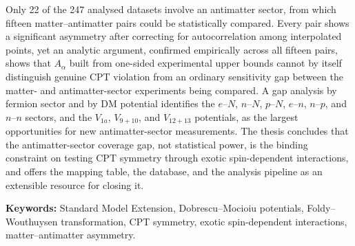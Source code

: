Only 22 of the 247 analysed datasets involve an antimatter sector, from
which fifteen matter--antimatter pairs could be statistically compared. Every pair shows
a significant asymmetry after correcting for autocorrelation among
interpolated points, yet an analytic argument, confirmed empirically across
all fifteen pairs, shows that $A_\alpha$ built from one-sided experimental
upper bounds cannot by itself distinguish genuine CPT violation from an
ordinary sensitivity gap between the matter- and antimatter-sector
experiments being compared. A gap analysis by fermion sector and by DM
potential identifies the $e$--$N$, $n$--$N$, $p$--$N$, $e$--$n$, $n$--$p$,
and $n$--$n$ sectors,
and the $V_{1a}$, $V_{9+10}$, and $V_{12+13}$ potentials, as the largest
opportunities for new antimatter-sector measurements. The thesis concludes
that the antimatter-sector coverage gap, not statistical power, is the
binding constraint on testing CPT symmetry through exotic spin-dependent
interactions, and offers the mapping table, the database, and the analysis
pipeline as an extensible resource for closing it.

\textbf{Keywords:} Standard Model Extension, Dobrescu--Mocioiu potentials,
Foldy--Wouthuysen transformation, CPT symmetry, exotic spin-dependent
interactions, matter--antimatter asymmetry.
